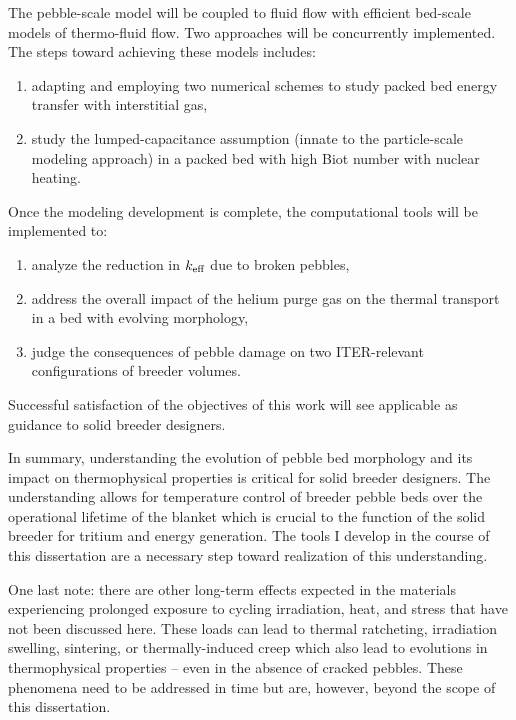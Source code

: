 The pebble-scale model will be coupled to fluid flow with efficient bed-scale models of thermo-fluid flow. Two approaches will be concurrently implemented. The steps toward achieving these models includes:
\begin{enumerate}
	\item adapting and employing two numerical schemes to study packed bed energy transfer with interstitial gas,
	\item study the lumped-capacitance assumption (innate to the particle-scale modeling approach) in a packed bed with high Biot number with nuclear heating.
\end{enumerate}

Once the modeling development is complete, the computational tools will be implemented to:
\begin{enumerate}
	\item analyze the reduction in $k_\text{eff}$ due to broken pebbles,
	\item address the overall impact of the helium purge gas on the thermal transport in a bed with evolving morphology,
	\item judge the consequences of pebble damage on two ITER-relevant configurations of breeder volumes.
\end{enumerate}

Successful satisfaction of the objectives of this work will see applicable as guidance to solid breeder designers.


In summary, understanding the evolution of pebble bed morphology and its impact on thermophysical properties is critical for solid breeder designers. The understanding allows for temperature control of breeder pebble beds over the operational lifetime of the blanket which is crucial to the function of the solid breeder for tritium and energy generation. The tools I develop in the course of this dissertation are a necessary step toward realization of this understanding. 

One last note: there are other long-term effects expected in the materials experiencing prolonged exposure to cycling irradiation, heat, and stress that have not been discussed here. These loads can lead to thermal ratcheting, irradiation swelling, sintering, or thermally-induced creep which also lead to evolutions in thermophysical properties -- even in the absence of cracked pebbles. These phenomena need to be addressed in time but are, however, beyond the scope of this dissertation. 
